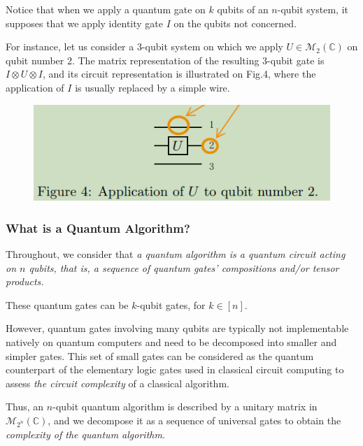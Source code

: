 Notice that when we apply a quantum gate on $k$ qubits of an $n$-qubit system, it supposes that we apply identity gate $I$ on the qubits not concerned. 

\begin{example}
For instance, let us consider a 3-qubit system on which we apply $U \in \mathcal{M}_{2}(\mathbb{C})$ on qubit number 2. The matrix representation of the resulting 3-qubit gate is $I \otimes U \otimes I$, and its circuit representation is illustrated on Fig.4, where the application of $I$ is usually replaced by a simple wire.
\begin{figure}[h]
    \centering
    \includegraphics[width=0.5\linewidth]{Images/grange2023-3.png}
\end{figure}
\end{example}

\subsubsection{What is a Quantum Algorithm?}

Throughout, we consider that \textit{a quantum algorithm is a quantum circuit acting on $n$ qubits, that is, a sequence of quantum gates' compositions and/or tensor products. } %

These quantum gates can be $k$-qubit gates, for $k \in[n]$. %

However, quantum gates involving many qubits are typically not implementable natively on quantum computers and need to be decomposed into smaller and simpler gates. This set of small gates can be considered as the quantum counterpart of the elementary logic gates used in classical circuit computing to assess \textit{the circuit complexity} of a classical algorithm. %

Thus, an $n$-qubit quantum algorithm is described by a unitary matrix in $\mathcal{M}_{2^{n}}(\mathbb{C})$, and we decompose it as a sequence of universal gates to obtain the \textit{complexity of the quantum algorithm}. %

